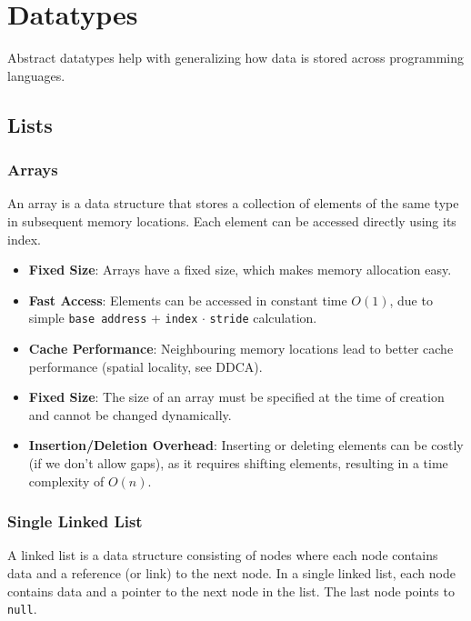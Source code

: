 \newsection
\section{Datatypes}
Abstract datatypes help with generalizing how data is stored across programming languages.

\subsection{Lists}
\subsubsection{Arrays}
An array is a data structure that stores a collection of elements of the same type in subsequent memory locations. Each element can be accessed directly using its index.

\begin{itemize}
    \item \textbf{Fixed Size}: Arrays have a fixed size, which makes memory allocation easy.
    \item \textbf{Fast Access}: Elements can be accessed in constant time \(O(1)\), due to simple \verb|base address| + \verb|index| $\cdot$ \verb|stride| calculation.
    \item \textbf{Cache Performance}: Neighbouring memory locations lead to better cache performance (spatial locality, see DDCA).
\end{itemize}

\begin{itemize}
    \item \textbf{Fixed Size}: The size of an array must be specified at the time of creation and cannot be changed dynamically.
    \item \textbf{Insertion/Deletion Overhead}: Inserting or deleting elements can be costly (if we don't allow gaps), as it requires shifting elements, resulting in a time complexity of \(O(n)\).
\end{itemize}

\subsubsection{Single Linked List}
A linked list is a data structure consisting of nodes where each node contains data and a reference (or link) to the next node.
In a single linked list, each node contains data and a pointer to the next node in the list. The last node points to \texttt{null}.

